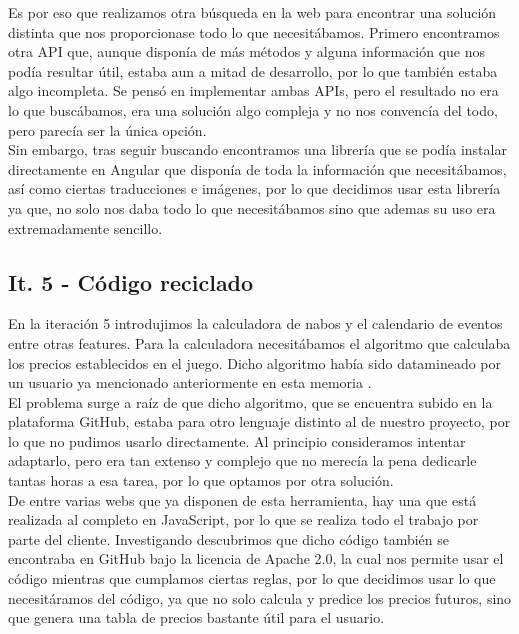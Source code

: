 Es por eso que realizamos otra búsqueda en la web para encontrar una solución distinta que nos proporcionase todo lo que necesitábamos. Primero encontramos otra API \citep{nookipediaapi} que, aunque disponía de más métodos y alguna información que nos podía resultar útil, estaba aun a mitad de desarrollo, por lo que también estaba algo incompleta. Se pensó en implementar ambas APIs, pero el resultado no era lo que buscábamos, era una solución algo compleja y no nos convencía del todo, pero parecía ser la única opción.\\

Sin embargo, tras seguir buscando encontramos una librería \citep{acnhnpm} que se podía instalar directamente en Angular que disponía de toda la información que necesitábamos, así como ciertas traducciones e imágenes, por lo que decidimos usar esta librería ya que, no solo nos daba todo lo que necesitábamos sino que ademas su uso era extremadamente sencillo. 

\subsection{It. 5 - Código reciclado}

En la iteración 5 introdujimos la calculadora de nabos y el calendario de eventos entre otras features. Para la calculadora necesitábamos el algoritmo que calculaba los precios establecidos en el juego. Dicho algoritmo había sido datamineado por un usuario ya mencionado anteriormente en esta memoria \citep{nabosninji}.\\

El problema surge a raíz de que dicho algoritmo, que se encuentra subido en la plataforma GitHub, estaba para otro lenguaje distinto al de nuestro proyecto, por lo que no pudimos usarlo directamente. Al principio consideramos intentar adaptarlo, pero era tan extenso y complejo que no merecía la pena dedicarle tantas horas a esa tarea, por lo que optamos por otra solución.\\

De entre varias webs que ya disponen de esta herramienta, hay una \citep{turnipprophet} que está realizada al completo en JavaScript, por lo que se realiza todo el trabajo por parte del cliente. Investigando descubrimos que dicho código también se encontraba en GitHub bajo la licencia de Apache 2.0, la cual nos permite usar el código mientras que cumplamos ciertas reglas, por lo que decidimos usar lo que necesitáramos del código, ya que no solo calcula y predice los precios futuros, sino que genera una tabla de precios bastante útil para el usuario.\\

